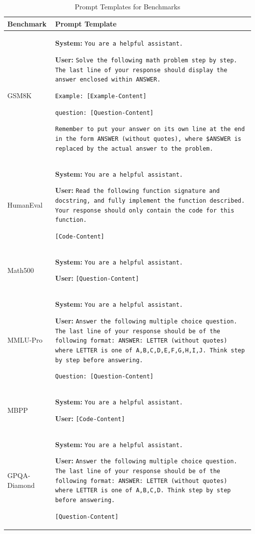 \documentclass{article}
\begin{document}
\begin{table}[!htbp]
  \centering
  \label{tab:evaluation_prompt_template}
  \scriptsize
  \setlength{\tabcolsep}{3pt}
\caption{Prompt Templates for Benchmarks}
\label{tab:full_benchmark_prompts}
\small
\begin{tabularx}{\textwidth}{l >{\raggedright\arraybackslash}X}
\toprule
\textbf{Benchmark} & \textbf{Prompt Template} \\
\midrule
GSM8K & 
\textbf{System:} \texttt{You are a helpful assistant.}\par
\textbf{User:} \texttt{Solve the following math problem step by step. The last line of your response should display the answer enclosed within ANSWER.}\par
\texttt{Example: [Example-Content]}\par
\texttt{question: [Question-Content]}\par
\texttt{Remember to put your answer on its own line at the end in the form ANSWER (without quotes), where \$ANSWER is replaced by the actual answer to the problem.} \\
\addlinespace
HumanEval & 
\textbf{System:} \texttt{You are a helpful assistant.}\par
\textbf{User:} \texttt{Read the following function signature and docstring, and fully implement the function described. Your response should only contain the code for this function.}\par
\texttt{[Code-Content]} \\
\addlinespace
Math500 & 
\textbf{System:} \texttt{You are a helpful assistant.}\par
\textbf{User:} \texttt{[Question-Content]} \\
\addlinespace
MMLU-Pro & 
\textbf{System:} \texttt{You are a helpful assistant.}\par
\textbf{User:} \texttt{Answer the following multiple choice question. The last line of your response should be of the following format: ANSWER: LETTER (without quotes) where LETTER is one of A,B,C,D,E,F,G,H,I,J. Think step by step before answering.}\par
\texttt{Question: [Question-Content]} \\
\addlinespace
MBPP & 
\textbf{System:} \texttt{You are a helpful assistant.}\par
\textbf{User:} \texttt{[Code-Content]} \\
\addlinespace
GPQA-Diamond & 
\textbf{System:} \texttt{You are a helpful assistant.}\par
\textbf{User:} \texttt{Answer the following multiple choice question. The last line of your response should be of the following format: ANSWER: LETTER (without quotes) where LETTER is one of A,B,C,D. Think step by step before answering.} \par
\texttt{[Question-Content]} \\
\bottomrule
\end{tabularx}
\end{table}
\end{document}
